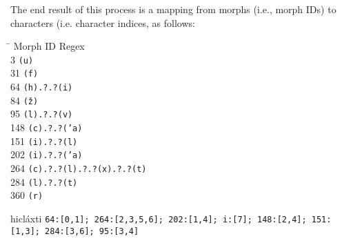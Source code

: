 The end result of this process is a mapping from morphs (i.e., morph IDs) to characters (i.e. character indices, as follows:
\begin{exe}
\ex \label{ex:noise-clusters}
	\begin{tabbing}
	\hspace{1in} \= \hspace{5.5in} \kill
	Morph ID \> Regex \\ 
                3 \> \texttt{(u)} \\
                31 \>  \texttt{(f)} \\
                64 \>  \texttt{(h).?.?(i)}  \\
                84 \>  \texttt{(\v{z})}  \\
                95 \>  \texttt{(l).?.?(v)}  \\
                148 \>   \texttt{(c).?.?(\a'{a})} \\
                151  \>  \texttt{(i).?.?(l)} \\
                202 \>  \texttt{(i).?.?(\a'{a})}  \\
                264 \>  \texttt{(c).?.?(l).?.?(x).?.?(t)}  \\
                284 \>  \texttt{(l).?.?(t)}  \\
                360 \>  \texttt{(r)} \\
	\end{tabbing}
\end{exe}
\begin{exe} \ex \label{ex:mapping} hicl\'{a}xti \quad \texttt{64:[0,1]; 264:[2,3,5,6]; 202:[1,4]; i:[7]; 148:[2,4]; 151:[1,3]; 284:[3,6]; 95:[3,4]}
\end{exe}


